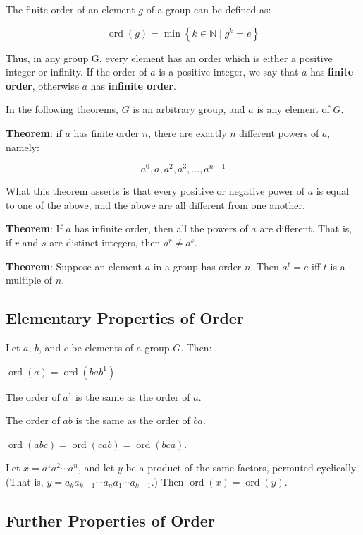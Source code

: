 \documentclass[11pt]{article}
\begin{document}
The finite order of an element \(g\) of a group can be defined as:

\[
\operatorname{ord}(g)=\min \left\{k \in \mathbb{N} \mid g^k=e\right\}
\]

Thus, in any group G, every element has an order which is either a
positive integer or infinity. If the order of \(a\) is a positive
integer, we say that \(a\) has \textbf{finite order}, otherwise \(a\)
has \textbf{infinite order}.

In the following theorems, \(G\) is an arbitrary group, and \(a\) is any
element of \(G\).

\textbf{Theorem}: if \(a\) has finite order \(n\), there are exactly
\(n\) different powers of \(a\), namely:

\[
a^0, a, a^2, a^3, \ldots, a^{n-1}
\]

What this theorem asserts is that every positive or negative power of
\(a\) is equal to one of the above, and the above are all different from
one another.

\textbf{Theorem}: If \(a\) has infinite order, then all the powers of
\(a\) are different. That is, if \(r\) and \(s\) are distinct integers,
then \(a^r \ne a^s\).

\textbf{Theorem}: Suppose an element \(a\) in a group has order \(n\).
Then \(a^t = e\) iff \(t\) is a multiple of \(n\).

\subsection{Elementary Properties of
Order}\label{elementary-properties-of-order}

Let \(a\), \(b\), and \(c\) be elements of a group \(G\). Then:

\(\operatorname{ord}(a) = \operatorname{ord}(bab^{1})\)

The order of \(a{^1}\) is the same as the order of \(a\).

The order of \(ab\) is the same as the order of \(ba\).

\(\operatorname{ord}(abc) = \operatorname{ord}(cab) = \operatorname{ord}(bca)\).

Let \(x=a^1 a^2 \cdots a^n\), and let \(y\) be a product of the same
factors, permuted cyclically. (That is,
\(y=a_k a_{k+1} \cdots a_n a_1 \cdots a_{k-1}\).) Then
\(\operatorname{ord}(x)=\operatorname{ord}(y)\).

\subsection{Further Properties of
Order}\label{further-properties-of-order}
\end{document}
